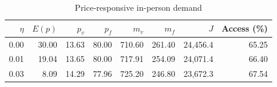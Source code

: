 \begin{table}[ht]
\centering\footnotesize
\caption{Price-responsive in-person demand}\label{tab:elasticity}
\begin{tabular}{@{}rrrrrrrr@{}}\toprule
$\eta$ & $E(p)$ & $p_v$ & $p_f$ & $m_v$ & $m_f$ & $J$ & Access (\%)\\\midrule
0.00 & 30.00 & 13.63 & 80.00 & 710.60 & 261.40 & 24,456.4 & 65.25\\
0.01 & 19.04 & 13.65 & 80.00 & 717.91 & 254.09 & 24,071.4 & 66.40\\
0.03 & 8.09 & 14.29 & 77.96 & 725.20 & 246.80 & 23,672.3 & 67.54\\
\bottomrule\end{tabular}
\end{table}
